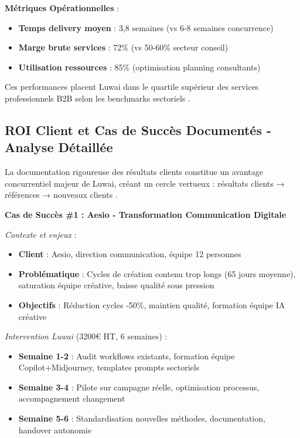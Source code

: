 \textbf{Métriques Opérationnelles} :
\begin{itemize}
    \item \textbf{Temps delivery moyen} : 3,8 semaines (vs 6-8 semaines concurrence)
    \item \textbf{Marge brute services} : 72\% (vs 50-60\% secteur conseil)
    \item \textbf{Utilisation ressources} : 85\% (optimisation planning consultants)
\end{itemize}

Ces performances placent Luwai dans le quartile supérieur des services professionnels B2B selon les benchmarks sectoriels \cite{professional_services2024benchmarks}.

\subsection{ROI Client et Cas de Succès Documentés - Analyse Détaillée}

La documentation rigoureuse des résultats clients constitue un avantage concurrentiel majeur de Luwai, créant un cercle vertueux : résultats clients → références → nouveaux clients \cite{reichheld2001loyalty}.

\textbf{Cas de Succès \#1 : Aesio - Transformation Communication Digitale}

\emph{Contexte et enjeux} \cite{luwai2025aesio} :
\begin{itemize}
    \item \textbf{Client} : Aesio, direction communication, équipe 12 personnes
    \item \textbf{Problématique} : Cycles de création contenu trop longs (65 jours moyenne), saturation équipe créative, baisse qualité sous pression
    \item \textbf{Objectifs} : Réduction cycles -50\%, maintien qualité, formation équipe IA créative
\end{itemize}

\emph{Intervention Luwai} (3200€ HT, 6 semaines) :
\begin{itemize}
    \item \textbf{Semaine 1-2} : Audit workflows existants, formation équipe Copilot+Midjourney, templates prompts sectoriels
    \item \textbf{Semaine 3-4} : Pilote sur campagne réelle, optimisation processus, accompagnement changement
    \item \textbf{Semaine 5-6} : Standardisation nouvelles méthodes, documentation, handover autonomie
\end{itemize}

